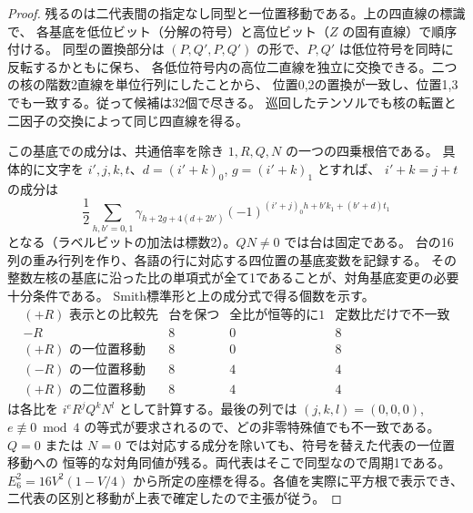 \begin{proof}
残るのは二代表間の指定なし同型と一位置移動である。上の四直線の標識で、
各基底を低位ビット（分解の符号）と高位ビット（$Z$ の固有直線）で順序付ける。
同型の置換部分は $(P,Q',P,Q')$ の形で、$P,Q'$ は低位符号を同時に反転するかともに保ち、
各低位符号内の高位二直線を独立に交換できる。二つの核の階数2直線を単位行列にしたことから、
位置0,2の置換が一致し、位置1,3でも一致する。従って候補は32個で尽きる。
巡回したテンソルでも核の転置と二因子の交換によって同じ四直線を得る。

この基底での成分は、共通倍率を除き $1,R,Q,N$ の一つの四乗根倍である。
具体的に文字を $i',j,k,t$、$d=(i'+k)_0$, $g=(i'+k)_1$ とすれば、
$i'+k=j+t$ の成分は
\[
 \frac12\sum_{h,b'=0,1}\gamma_{h+2g+4(d+2b')}
   (-1)^{(i'+j)_0h+b'k_1+(b'+d)t_1}
\]
となる（ラベルビットの加法は標数2）。$QN\ne0$ では台は固定である。
台の16列の重み行列を作り、各語の行に対応する四位置の基底変数を記録する。
その整数左核の基底に沿った比の単項式が全て1であることが、対角基底変更の必要十分条件である。
Smith標準形と上の成分式で得る個数を示す。
\[
\begin{array}{c|rrr}
 (+R)\text{ 表示との比較先}&\text{台を保つ}&\text{全比が恒等的に1}&
 \text{定数比だけで不一致}\\ \hline
 -R&8&0&8\\
 (+R)\text{ の一位置移動}&8&0&8\\
 (-R)\text{ の一位置移動}&8&4&4\\
 (+R)\text{ の二位置移動}&8&4&4
\end{array}
\]
 は各比を
$i^eR^jQ^kN^l$ として計算する。最後の列では $(j,k,l)=(0,0,0)$,
$e\not\equiv0\bmod4$ の等式が要求されるので、どの非零特殊値でも不一致である。
$Q=0$ または $N=0$ では対応する成分を除いても、符号を替えた代表の一位置移動への
恒等的な対角同値が残る。両代表はそこで同型なので周期1である。
$E_6^2=16V^2(1-V/4)$ から所定の座標を得る。各値を実際に平方根で表示でき、
二代表の区別と移動が上表で確定したので主張が従う。
\end{proof}
